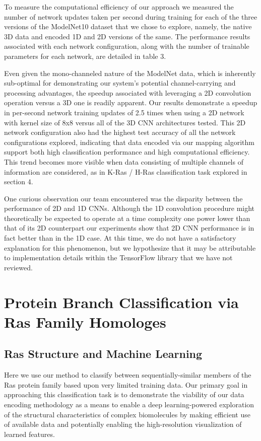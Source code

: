 \documentclass{article}
\begin{document}
To measure the computational efficiency of our approach we measured the number of network updates taken per second during training for each of the three versions of the ModelNet10 dataset that we chose to explore, namely, the native 3D data and encoded 1D and 2D versions of the same. The performance results associated with each network configuration, along with the number of trainable parameters for each network, are detailed in table 3.

Even given the mono-channeled nature of the ModelNet data, which is inherently sub-optimal for demonstrating our system's potential channel-carrying and processing advantages, the speedup associated with leveraging a 2D convolution operation versus a 3D one is readily apparent. Our results demonstrate a speedup in per-second network training updates of 2.5 times when using a 2D network with kernel size of 8x8 versus all of the 3D CNN architectures tested. This 2D network configuration also had the highest test accuracy of all the network configurations explored, indicating that data encoded via our mapping algorithm support both high classification performance and high computational efficiency. This trend becomes more visible when data consisting of multiple channels of information are considered, as in K-Ras / H-Ras classification task explored in section 4.

One curious observation our team encountered was the disparity between the performance of 2D and 1D CNNs. Although the 1D convolution procedure might theoretically be expected to operate at a time complexity one power lower than that of its 2D counterpart our experiments show that 2D CNN performance is in fact better than in the 1D case. At this time, we do not have a satisfactory explanation for this phenomenon, but we hypothesize that it may be attributable to implementation details within the TensorFlow library that we have not reviewed. 

\section{Protein Branch Classification via Ras Family Homologes}
\label{case-kras_hras}

\subsection{Ras Structure and Machine Learning}

Here we use our method to classify between sequentially-similar members of the Ras protein family based upon very limited training data. Our primary goal in approaching this classification task is to demonstrate the viability of our data encoding methodology as a means to enable a deep learning-powered exploration of the structural characteristics of complex biomolecules by making efficient use of available data and potentially enabling the high-resolution visualization of learned features.
\end{document}
